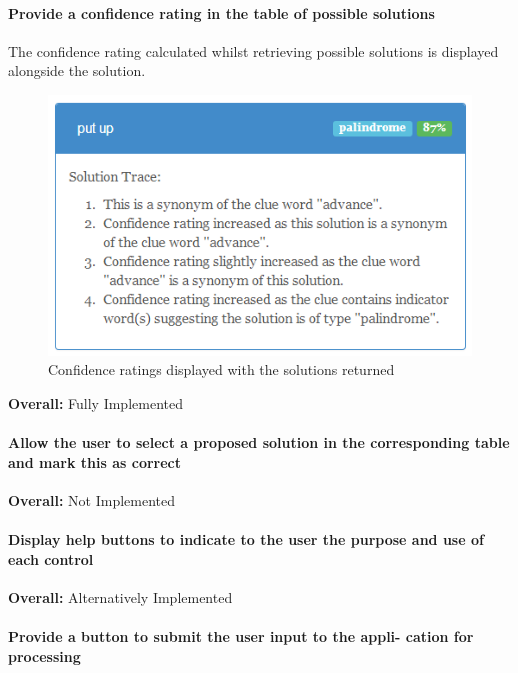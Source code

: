 \paragraph{Provide a confidence rating in the table of possible solutions}

The confidence rating calculated whilst retrieving possible solutions is displayed 
alongside the solution.

\begin{figure}[H]
	\centering
	\includegraphics[keepaspectratio=true]{evidence/confidence.png}
	\caption{Confidence ratings displayed with the solutions returned}
\end{figure}

{\bf Overall:} Fully Implemented

\paragraph{Allow the user to select a proposed solution in the corresponding table and mark this as correct}

{\bf Overall:} Not Implemented

\paragraph{Display help buttons to indicate to the user the purpose
and use of each control}

{\bf Overall:} Alternatively Implemented

\paragraph{Provide a button to submit the user input to the appli-
cation for processing}

